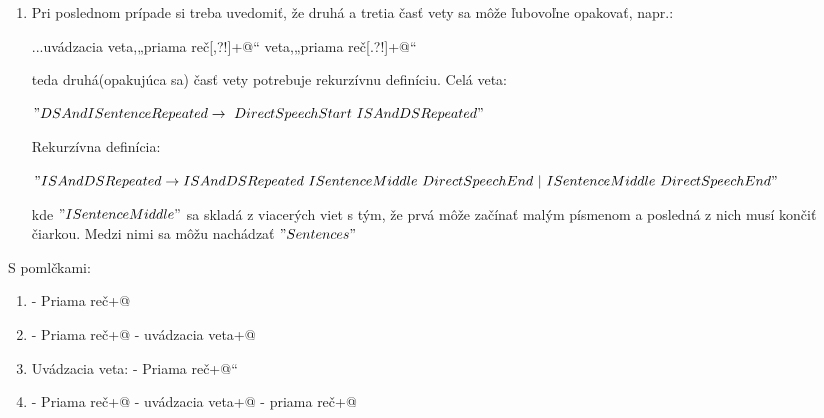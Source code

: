 \documentclass[12pt,a4paper]{report}
\theoremstyle{definition}
\theoremstyle{remark}
\begin{document}
\begin{enumerate}[leftmargin=*]
\item Pri poslednom prípade si treba uvedomiť, že druhá a tretia časť vety sa môže ľubovoľne opakovať, napr.: 

\verb@...uvádzacia veta,„priama reč[,?!]+@“  veta,„priama reč[.?!]+@“


teda druhá(opakujúca sa) časť vety potrebuje rekurzívnu definíciu. Celá veta:


$"DSAndISentenceRepeated \to \ DirectSpeechStart \ ISAndDSRepeated"$

Rekurzívna definícia:


$"ISAndDSRepeated \to \\ ISAndDSRepeated \ ISentenceMiddle \ DirectSpeechEnd \ | \\ \ ISentenceMiddle\ DirectSpeechEnd"$

kde $"ISentenceMiddle"$ sa skladá z viacerých viet s tým, že prvá môže začínať malým písmenom a posledná z nich musí končiť čiarkou. Medzi nimi sa môžu nachádzať $"Sentences"$ 
\end{enumerate}
\newpage
\noindent S pomlčkami:
\begin{enumerate}[leftmargin=*]
\item - Priama reč\verb@[.?!]+@
\item - Priama reč\verb@[,?!]+@ - uvádzacia veta\verb@[.?!]+@
\item Uvádzacia veta: - Priama reč\verb@[.?!]+@“
\item - Priama reč\verb@[,?!]+@ - uvádzacia veta\verb@[,?!]+@ - priama reč\verb@[.?!]+@
\end{enumerate}
\end{document}
